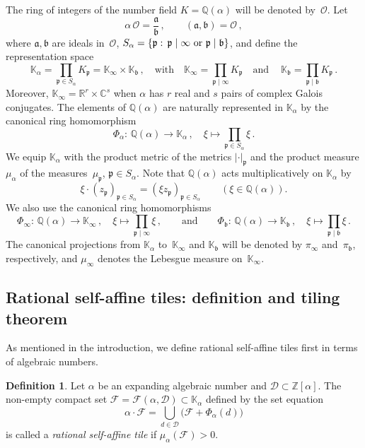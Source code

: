 \documentclass[12pt]{amsart}
\theoremstyle{definition}
\newtheorem{definition}{Definition}
\theoremstyle{remark}
\numberwithin{equation}{section}
\begin{document}
The ring of integers of the number field $K = \mathbb{Q}(\alpha)$ will be denoted by~$\mathcal{O}$.
Let
\[
\alpha\, \mathcal{O} = \frac{\mathfrak{a}}{\mathfrak{b}}\,, \qquad (\mathfrak{a}, \mathfrak{b}) = \mathcal{O}\,,
\]
where $\mathfrak{a},\mathfrak{b}$ are ideals in~$\mathcal{O}$, $S_\alpha=\{\mathfrak{p}:\, \mathfrak{p} \mid \infty\ \hbox{or}\ \mathfrak{p} \mid \mathfrak{b}\}$, and define the representation space
\[
\mathbb{K}_\alpha = \prod_{\mathfrak{p} \in S_\alpha} K_\mathfrak{p} = \mathbb{K}_\infty \times \mathbb{K}_\mathfrak{b}\,, \quad \mbox{with} \quad \mathbb{K}_\infty =  \prod_{\mathfrak{p}\mid\infty} K_\mathfrak{p}\quad \mbox{and} \quad\ \mathbb{K}_\mathfrak{b} = \prod_{\mathfrak{p}\mid\mathfrak{b}} K_{\mathfrak{p}}\,.
\]
Moreover, $\mathbb{K}_\infty = \mathbb{R}^r \times \mathbb{C}^s$ when $\alpha$ has $r$ real and $s$ pairs of complex Galois conjugates.
The elements of $\mathbb{Q}(\alpha)$ are naturally represented in $\mathbb{K}_\alpha$ by the canonical ring homomorphism
\[
\Phi_\alpha:\, \mathbb{Q}(\alpha) \to \mathbb{K}_\alpha\,, \quad \xi \mapsto\prod_{\mathfrak{p}\in S_\alpha} \xi\,.
\]
We equip $\mathbb{K}_\alpha$ with the product metric of the metrics $\lvert\cdot\rvert_\mathfrak{p}$ and the product measure $\mu_\alpha$ of the measures~$\mu_\mathfrak{p}$, $\mathfrak{p}\in S_\alpha$.
Note that $\mathbb{Q}(\alpha)$ acts multiplicatively on $\mathbb{K}_\alpha$ by
\[
\xi \cdot (z_\mathfrak{p})_{\mathfrak{p}\in S_\alpha} = (\xi z_\mathfrak{p})_{\mathfrak{p}\in S_\alpha} \qquad (\xi \in \mathbb{Q}(\alpha)).
\]
We also use the canonical ring homomorphisms
\[
\Phi_\infty:\, \mathbb{Q}(\alpha) \to \mathbb{K}_\infty\,, \quad \xi \mapsto \prod_{\mathfrak{p}\mid\infty} \xi\,, \qquad \mbox{and} \qquad \Phi_\mathfrak{b}:\, \mathbb{Q}(\alpha) \to \mathbb{K}_\mathfrak{b}\,, \quad \xi \mapsto \prod_{\mathfrak{p}\mid\mathfrak{b}} \xi\,.
\]
The canonical projections from $\mathbb{K}_\alpha$ to~$\mathbb{K}_\infty$ and $\mathbb{K}_\mathfrak{b}$ will be denoted by $\pi_\infty$ and~$\pi_\mathfrak{b}$, respectively, and $\mu_\infty$ denotes the Lebesgue measure on~$\mathbb{K}_\infty$.

\subsection*{Rational self-affine tiles: definition and tiling theorem}
As mentioned in the introduction, we define rational self-affine tiles first in terms of algebraic numbers.

\begin{definition}
Let $\alpha$ be an expanding algebraic number and $\mathcal{D} \subset \mathbb{Z}[\alpha]$. 
The non-empty compact set $\mathcal{F}=\mathcal{F}(\alpha,\mathcal{D}) \subset \mathbb{K}_\alpha$ defined by the set equation
\begin{equation}\label{seteq}
\alpha \cdot \mathcal{F} = \bigcup_{d\in \mathcal{D}} \big(\mathcal{F} + \Phi_\alpha(d)\big)
\end{equation}
is called a \emph{rational self-affine tile} if $\mu_\alpha(\mathcal{F}) > 0$.
\end{definition}
\end{document}
